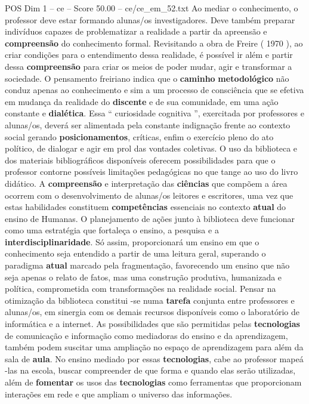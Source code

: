\begin{textsample}{POS Dim 1 – ce – Score 50.00 – ce/ce\_em\_52.txt}
Ao mediar o conhecimento, o professor deve estar formando alunas/os investigadores.
Deve também preparar indivíduos capazes de problematizar a realidade a partir da apreensão e \textbf{compreensão} do conhecimento formal.
Revisitando a obra de Freire ( 1970 ), ao criar condições para o entendimento dessa realidade, é possível ir além e partir dessa \textbf{compreensão} para criar os meios de poder mudar, agir e transformar a sociedade.
O pensamento freiriano indica que o \textbf{caminho} \textbf{metodológico} não conduz apenas ao conhecimento e sim a um processo de consciência que se efetiva em mudança da realidade do \textbf{discente} e de sua comunidade, em uma ação constante e \textbf{dialética}.
Essa “ curiosidade cognitiva ”, exercitada por professores e alunas/os, deverá ser alimentada pela constante indignação frente ao contexto social gerando \textbf{posicionamentos}, críticas, enfim o exercício pleno do ato político, de dialogar e agir em prol das vontades coletivas.
O uso da biblioteca e dos materiais bibliográficos disponíveis oferecem possibilidades para que o professor contorne possíveis limitações pedagógicas no que tange ao uso do livro didático.
A \textbf{compreensão} e interpretação das \textbf{ciências} que compõem a área ocorrem com o desenvolvimento de alunas/os leitores e escritores, uma vez que estas habilidades constituem \textbf{competências} essenciais no contexto \textbf{atual} do ensino de Humanas.
O planejamento de ações junto à biblioteca deve funcionar como uma estratégia que fortaleça o ensino, a pesquisa e a \textbf{interdisciplinaridade}.
Só assim, proporcionará um ensino em que o conhecimento seja entendido a partir de uma leitura geral, superando o paradigma \textbf{atual} marcado pela fragmentação, favorecendo um ensino que não seja apenas o relato de fatos, mas uma construção produtiva, humanizada e política, comprometida com transformações na realidade social.
Pensar na otimização da biblioteca constitui -se numa \textbf{tarefa} conjunta entre professores e alunas/os, em sinergia com os demais recursos disponíveis como o laboratório de informática e a internet.
As possibilidades que são permitidas pelas \textbf{tecnologias} de comunicação e informação como mediadoras do ensino e da aprendizagem, também podem suscitar uma ampliação no espaço de aprendizagem para além da sala de \textbf{aula}.
No ensino mediado por essas \textbf{tecnologias}, cabe ao professor mapeá -las na escola, buscar compreender de que forma e quando elas serão utilizadas, além de \textbf{fomentar} os usos das \textbf{tecnologias} como ferramentas que proporcionam interações em rede e que ampliam o universo das informações.

\end{textsample}
